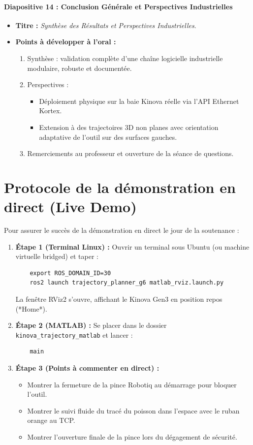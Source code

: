 \documentclass[11pt,a4paper]{report}
\begin{document}
\paragraph{Diapositive 14 : Conclusion Générale et Perspectives Industrielles}
\begin{itemize}
    \item \textbf{Titre :} \textit{Synthèse des Résultats et Perspectives Industrielles}.
    \item \textbf{Points à développer à l'oral :}
    \begin{enumerate}
        \item Synthèse : validation complète d'une chaîne logicielle industrielle modulaire, robuste et documentée.
        \item Perspectives :
        \begin{itemize}
            \item Déploiement physique sur la baie Kinova réelle via l'API Ethernet Kortex.
            \item Extension à des trajectoires 3D non planes avec orientation adaptative de l'outil sur des surfaces gauches.
        \end{itemize}
        \item Remerciements au professeur et ouverture de la séance de questions.
    \end{enumerate}
\end{itemize}

\section{Protocole de la démonstration en direct (Live Demo)}
Pour assurer le succès de la démonstration en direct le jour de la soutenance :
\begin{enumerate}
    \item \textbf{Étape 1 (Terminal Linux) :} Ouvrir un terminal sous Ubuntu (ou machine virtuelle bridged) et taper :
    \begin{verbatim}
    export ROS_DOMAIN_ID=30
    ros2 launch trajectory_planner_g6 matlab_rviz.launch.py
    \end{verbatim}
    La fenêtre RViz2 s'ouvre, affichant le Kinova Gen3 en position repos (*Home*).
    \item \textbf{Étape 2 (MATLAB) :} Se placer dans le dossier \texttt{kinova\_trajectory\_matlab} et lancer :
    \begin{verbatim}
    main
    \end{verbatim}
    \item \textbf{Étape 3 (Points à commenter en direct) :}
    \begin{itemize}
        \item Montrer la fermeture de la pince Robotiq au démarrage pour bloquer l'outil.
        \item Montrer le suivi fluide du tracé du poisson dans l'espace avec le ruban orange au TCP.
        \item Montrer l'ouverture finale de la pince lors du dégagement de sécurité.
    \end{itemize}
\end{enumerate}
\end{document}
